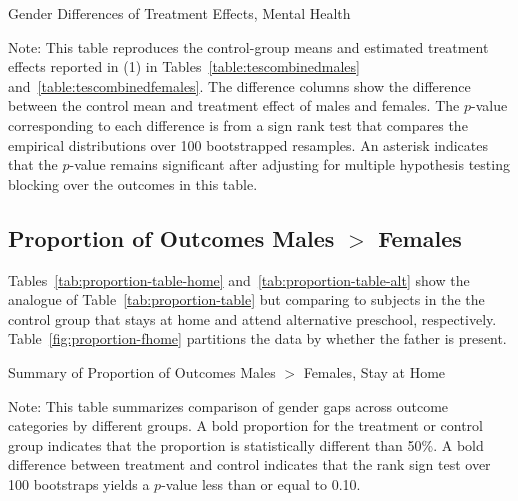 \begin{table}[!htbp]
\centering
\begin{threeparttable}
\caption{Gender Differences of Treatment Effects, Mental Health}
\begin{scriptsize}

\end{scriptsize}
\begin{tablenotes}
\scriptsize
Note: This table reproduces the control-group means and estimated treatment effects reported in (1) in Tables~\ref{table:tescombinedmales} and~\ref{table:tescombinedfemales}. The difference columns show the difference between the control mean and treatment effect of males and females. The $p$-value corresponding to each difference is from a sign rank test that compares the empirical distributions over 100 bootstrapped resamples. An asterisk indicates that the $p$-value remains significant after adjusting for multiple hypothesis testing blocking over the outcomes in this table.
\end{tablenotes}
\end{threeparttable}
\end{table}

\subsection{Proportion of Outcomes Males $>$ Females}
\label{appendix:propmales-females}

Tables~\ref{tab:proportion-table-home} and~\ref{tab:proportion-table-alt} show the analogue of Table~\ref{tab:proportion-table} but comparing to subjects in the the control group that stays at home and attend alternative preschool, respectively. Table~\ref{fig:proportion-fhome} partitions the data by whether the father is present.


\begin{table}[H]
\centering
\caption{Summary of Proportion of Outcomes Males $>$ Females, Stay at Home}
\label{tab:proportion-table-home}
\begin{threeparttable}

\begin{tablenotes}
\footnotesize
\item Note: This table summarizes comparison of gender gaps across outcome categories by different groups. A bold proportion for the treatment or control group indicates that the proportion is statistically different than 50\%. A bold difference between treatment and control indicates that the rank sign test over 100 bootstraps yields a $p$-value less than or equal to 0.10. 
\end{tablenotes}
\end{threeparttable}
\end{table}

